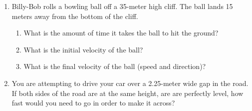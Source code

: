 \documentclass[letterpaper, 12pt]{article}
\begin{document}
\begin{enumerate}
\item Billy-Bob rolls a bowling ball off a 35-meter high cliff.  The ball lands 15 meters away from the bottom of the cliff.
\begin{enumerate}
	\item What is the amount of time it takes the ball to hit the ground?
	\vspace{0.6in}
	\item What is the initial velocity of the ball?
	\vspace{0.6in} 
	\item What is the final velocity of the ball (speed and direction)?
	\vspace{0.6in} 
\end{enumerate}



\item You are attempting to drive your car over a 2.25-meter wide gap in the road.  If both sides of the road are at the same height, are are perfectly level, how fast would you need to go in order to make it across?
	\vspace{0.5in} 
\end{enumerate}
 
\end{document}

